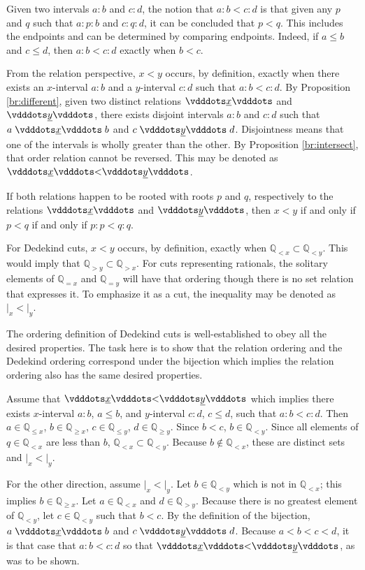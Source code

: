 \documentclass[12pt]{article}
\newcommand{\qcut}[2][x]{\ensuremath{\mathbb{Q}_{#2 #1}}}
\newcommand{\qlt}[1][x]{\qcut[#1]{<}}
\newcommand{\qeq}[1][x]{\qcut[#1]{=}}
\newcommand{\qgt}[1][x]{\qcut[#1]{>}}
\newcommand{\qgeq}[1][x]{\qcut[#1]{\geq}}
\newcommand{\qleq}[1][x]{\qcut[#1]{\leq}}
\newcommand{\cut}[1][x]{{\vert}_{#1} }
\newcommand{\yrel}{\xrel[y]}
\begin{document}
Given two intervals $a:b$ and $c:d$, the notion that $a:b < c:d$ is that given any $p$ and $q$ such that $a:p:b$ and $c:q:d$, it can be concluded that $p < q$. This includes the endpoints and can be determined by comparing endpoints. Indeed, if $a\leq b$ and $c \leq d$, then $a:b < c:d$ exactly when $b < c$. 

From the relation perspective, $x < y$ occurs, by definition, exactly when there exists an $x$-interval $a:b$ and a $y$-interval $c:d$ such that $a:b < c:d$. By Proposition \ref{br:different}, given two distinct relations $\xrel$ and $\yrel$, there exists disjoint intervals $a:b$ and $c:d$ such that $a \xrel b$ and $c \yrel d$. Disjointness means that one of the intervals is wholly greater than the other. By Proposition \ref{br:intersect}, that order relation cannot be reversed.  This may be denoted as $\xrel < \yrel$. 

If both relations happen to be  rooted with roots $p$ and $q$, respectively to the relations $\xrel$ and $\yrel$, then $x<y$ if and only if $p < q$ if and only if $p:p < q:q$. 

For Dedekind cuts, $x < y$ occurs, by definition, exactly when $\qlt \subset \qlt[y]$. This would imply that $\qgt[y] \subset \qgt$. For cuts representing rationals, the solitary elements of $\qeq$ and $\qeq[y]$ will have that ordering though there is no set relation that expresses it. To emphasize it as a cut, the inequality may be denoted as $\cut < \cut[y]$.

The ordering definition of Dedekind cuts is well-established to obey all the desired properties. The task here is to show that the relation ordering and the Dedekind ordering correspond under the bijection which implies the relation ordering also has the same desired properties. 

Assume that $\xrel < \yrel$ which implies there exists $x$-interval $a:b$, $a \leq b$,  and $y$-interval $c:d$, $c \leq d$, such that $a:b < c:d$. Then $a \in \qleq$, $b \in \qgeq$, $c \in \qleq[y]$, $d \in \qgeq[y]$. Since $ b< c$, $b \in \qlt[y]$. Since all elements of $q \in \qlt$ are less than $b$, $\qlt \subset \qlt[y]$. Because $b\notin \qlt$, these are distinct sets and $\cut < \cut[y]$. 

For the other direction, assume $\cut < \cut[y]$. Let $b \in \qlt[y]$ which is not in $\qlt$; this implies $b \in \qgeq$. Let $a \in \qlt$ and $d \in \qgt[y]$.  Because there is no greatest element of $\qlt[y]$, let $c\in \qlt[y]$ such that $b < c$. By the definition of the bijection,  $a \xrel b$ and $c \yrel d$. Because $a < b < c < d$, it is that case that $a:b < c:d$ so that $\xrel < \yrel$, as was to be shown. 
\end{document}

